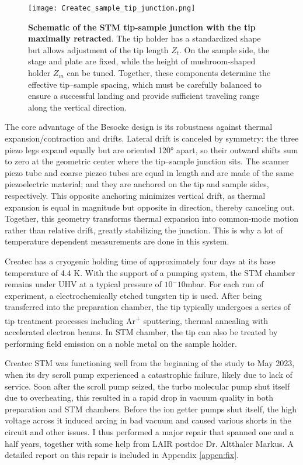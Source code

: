 \begin{figure}
	\centering
	\texttt{[image: Createc\_sample\_tip\_junction.png]}
	\caption[\textbf{Schematic of the STM tip-sample junction with the tip maximally retracted}]{\textbf{Schematic of the STM tip-sample junction with the tip maximally retracted}. The tip holder has a standardized shape but allows adjustment of the tip length $Z_t$. On the sample side, the stage and plate are fixed, while the height of mushroom-shaped holder $Z_m$ can be tuned. Together, these components determine the effective tip–sample spacing, which must be carefully balanced to ensure a successful landing and provide sufficient traveling range along the vertical direction.}
	\label{fig:Createc-tip-sample-junction}
\end{figure}

The core advantage of the Besocke design is its robustness against thermal expansion/contraction and drifts. Lateral drift is canceled by symmetry: the three piezo legs expand equally but are oriented 120° apart, so their outward shifts sum to zero at the geometric center where the tip–sample junction sits. The scanner piezo tube and coarse piezeo tubes are equal in length and are made of the same piezoelectric material; and they are anchored on the tip and sample sides, respectively. This opposite anchoring minimizes vertical drift, as thermal expansion is equal in magnitude but opposite in direction, thereby canceling out. Together, this geometry transforms thermal expansion into common-mode motion rather than relative drift, greatly stabilizing the junction. This is why a lot of temperature dependent measurements are done in this system\cite{chiScanningTunnelingSpectroscopy2012}. 

Createc has a cryogenic holding time of approximately four days at its base temperature of 4.4 K. With the support of a pumping system, the STM chamber remains under UHV at a typical pressure of $10^-10$mbar. For each run of experiment, a electrochemically etched tungsten tip is used. After being transferred into the preparation chamber, the tip typically undergoes a series of tip treatment processes including Ar\textsuperscript{+} sputtering, thermal annealing with accelerated electron beams. In STM chamber, the tip can also be treated by performing field emission on a noble metal on the sample holder. 

Createc \ac{STM} was functioning well from the beginning of the study to May 2023, when its dry scroll pump experienced a catastrophic failure, likely due to lack of service. Soon after the scroll pump seized, the turbo molecular pump shut itself due to overheating, this resulted in a rapid drop in vacuum quality in both preparation and STM chambers. Before the ion getter pumps shut itself, the high voltage across it induced arcing in bad vacuum and caused various shorts in the circuit and other issues. I thus performed a major repair that spanned one and a half years, together with some help from LAIR postdoc Dr. Altthaler Markus. A detailed report on this repair is included in Appendix \ref{appen:fix}. 

